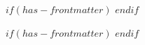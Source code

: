 $if(has-frontmatter)$
\frontmatter
$endif$


\clearpage

\clearpage

$if(has-frontmatter)$
\mainmatter
$endif$